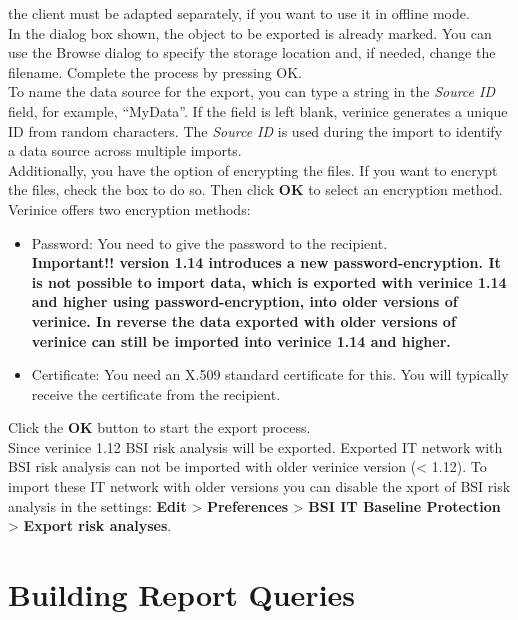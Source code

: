 \documentclass[a4paper,10pt]{book}
\begin{document}
the client must be adapted separately, if you want to use it in offline mode.
\newline\\
In the dialog box shown, the object to be exported is already marked. You can use the Browse dialog
to specify the storage location and, if needed, change the filename. Complete the process by pressing OK.
\newline\\
To name the data source for the export, you can type a string in the \textit{Source ID} field, for example,
``MyData''. If the field is left blank, verinice generates a unique ID from random characters. The \textit{Source ID}
is used during the import to identify a data source across multiple imports.
\newline\\
Additionally, you have the option of encrypting the files. If you want to encrypt the files, check the
box to do so. Then click \textbf{OK} to select an encryption method.
\newline\\
Verinice offers two encryption methods:
\begin{itemize}
 \item Password: You need to give the password to the recipient.\\
 \textbf{Important!! version 1.14 introduces a new password-encryption. It is
 not possible to import data, which is exported with verinice 1.14 and higher
 using password-encryption, into older versions of verinice. In reverse the
 data exported with older versions of verinice can still be imported into
 verinice 1.14 and higher.}
 \item Certificate: You need an X.509 standard certificate for this. You will typically receive the certificate from the recipient.
\end{itemize}
Click the \textbf{OK} button to start the export process.
\newline\\
Since verinice 1.12 BSI risk analysis will be exported. Exported IT network with BSI risk analysis can not be imported with older verinice version (< 1.12).
To import these IT network with older versions you can disable the xport of BSI risk analysis in the
settings: \textbf{Edit} \textgreater \textbf{ Preferences} \textgreater \textbf{ BSI IT Baseline Protection} \textgreater \textbf{ Export risk analyses}.


\section{Building Report Queries}\label{building-report-queries}
\end{document}
